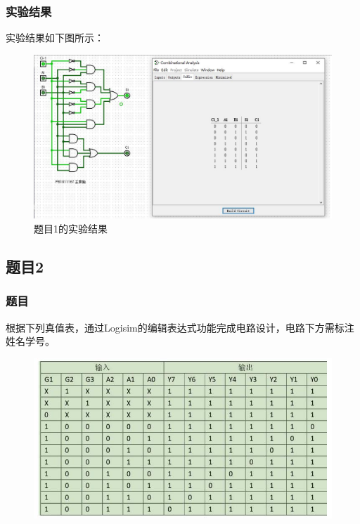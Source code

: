 \documentclass[UTF8]{article}
\begin{document}
	\subsubsection{实验结果}
	实验结果如下图所示：\par
	\begin{figure}[H]
		\centering
		\includegraphics[scale=0.5]{Problem1.jpg}
		\caption{题目1的实验结果}
		\label{Problem1}
	\end{figure}\par

	\subsection{题目2}
	\subsubsection{题目}
	根据下列真值表，通过Logisim的编辑表达式功能完成电路设计，电路下方需标注姓名学号。\par
	\begin{figure}[h]
		\centering
		\includegraphics[scale=0.6]{Problem2_BoolTable.jpg}
		\label{Problem2_BoolTable}
	\end{figure}\par
\end{document}
